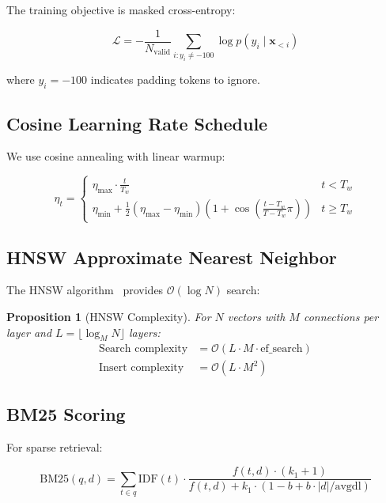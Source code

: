 \documentclass[11pt,a4paper]{article}
\theoremstyle{plain}
\newtheorem{proposition}[theorem]{Proposition}
\theoremstyle{definition}
\newcommand{\calL}{\mathcal{L}}
\newcommand{\calO}{\mathcal{O}}
\begin{document}
The training objective is masked cross-entropy:

\begin{equation}
    \calL = -\frac{1}{N_{\text{valid}}} \sum_{i : y_i \neq -100} \log p(y_i \mid \mathbf{x}_{<i})
    \label{eq:loss}
\end{equation}

where $y_i = -100$ indicates padding tokens to ignore.

\subsection{Cosine Learning Rate Schedule}

We use cosine annealing with linear warmup:

\begin{equation}
    \eta_t = \begin{cases}
        \eta_{\max} \cdot \frac{t}{T_w} & t < T_w \\
        \eta_{\min} + \frac{1}{2}(\eta_{\max} - \eta_{\min})\left(1 + \cos\left(\frac{t - T_w}{T - T_w}\pi\right)\right) & t \geq T_w
    \end{cases}
    \label{eq:cosine}
\end{equation}

\subsection{HNSW Approximate Nearest Neighbor}

The HNSW algorithm~\cite{malkov2018hnsw} provides $\calO(\log N)$ search:

\begin{proposition}[HNSW Complexity]
For $N$ vectors with $M$ connections per layer and $L = \lfloor \log_M N \rfloor$
layers:
\begin{align}
    \text{Search complexity} &= \calO(L \cdot M \cdot \text{ef\_search}) \\
    \text{Insert complexity} &= \calO(L \cdot M^2)
\end{align}
\end{proposition}

\subsection{BM25 Scoring}

For sparse retrieval:

\begin{equation}
    \text{BM25}(q, d) = \sum_{t \in q} \text{IDF}(t) \cdot \frac{f(t,d) \cdot (k_1 + 1)}{f(t,d) + k_1 \cdot (1 - b + b \cdot |d|/\text{avgdl})}
    \label{eq:bm25}
\end{equation}
\end{document}
